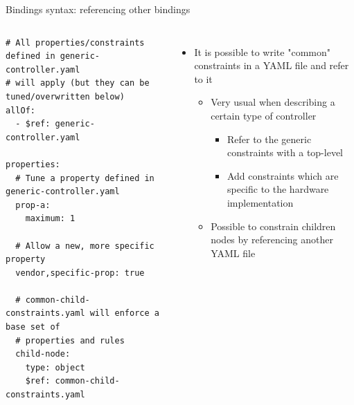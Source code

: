 \begin{frame}[fragile]{Bindings syntax: referencing other bindings}
  \begin{columns}
    \begin{block}{}
      {\fontsize{5}{6}\selectfont
\begin{verbatim}
# All properties/constraints defined in generic-controller.yaml
# will apply (but they can be tuned/overwritten below)
allOf:
  - $ref: generic-controller.yaml

properties:
  # Tune a property defined in generic-controller.yaml
  prop-a:
    maximum: 1

  # Allow a new, more specific property
  vendor,specific-prop: true

  # common-child-constraints.yaml will enforce a base set of
  # properties and rules
  child-node:
    type: object
    $ref: common-child-constraints.yaml
\end{verbatim}
      }
    \end{block}
    \begin{itemize}
    \item It is possible to write "common" constraints in a YAML file
      and refer to it
      \begin{itemize}
      \item Very usual when describing a certain type of controller
        \begin{itemize}
        \item Refer to the generic constraints with a top-level
        \item Add constraints which are specific to the hardware
          implementation
        \end{itemize}
      \item Possible to constrain children nodes by referencing another
        YAML file
      \end{itemize}
    \end{itemize}
  \end{columns}
\end{frame}

